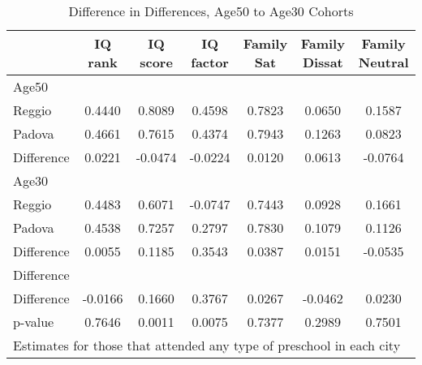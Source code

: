 \begin{table}[htbp]\centering
\caption{Difference in Differences, Age50 to Age30 Cohorts}
\begin{tabular}{l*{6}{c}}
\hline\hline
            &     IQ rank&    IQ score&   IQ factor&  Family Sat&Family Dissat&Family Neutral\\
\hline
Age50       &            &            &            &            &            &            \\
Reggio      &      0.4440&      0.8089&      0.4598&      0.7823&      0.0650&      0.1587\\
Padova      &      0.4661&      0.7615&      0.4374&      0.7943&      0.1263&      0.0823\\
Difference  &      0.0221&     -0.0474&     -0.0224&      0.0120&      0.0613&     -0.0764\\
\hline
Age30       &            &            &            &            &            &            \\
Reggio      &      0.4483&      0.6071&     -0.0747&      0.7443&      0.0928&      0.1661\\
Padova      &      0.4538&      0.7257&      0.2797&      0.7830&      0.1079&      0.1126\\
Difference  &      0.0055&      0.1185&      0.3543&      0.0387&      0.0151&     -0.0535\\
\hline
Difference  &            &            &            &            &            &            \\
Difference  &     -0.0166&      0.1660&      0.3767&      0.0267&     -0.0462&      0.0230\\
p-value     &      0.7646&      0.0011&      0.0075&      0.7377&      0.2989&      0.7501\\
\hline\hline
\multicolumn{7}{l}{\footnotesize Estimates for those that attended any type of preschool in each city}\\
\end{tabular}
\end{table}
